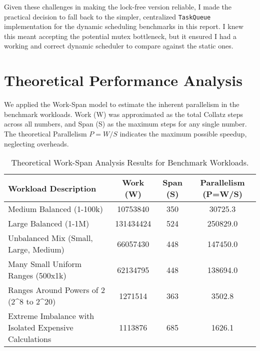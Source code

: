 \documentclass[10pt]{article}
\newcommand{\code}[1]{\texttt{#1}} %
\begin{document}
Given these challenges in making the lock-free version reliable, I made the practical decision to fall back to the simpler, centralized \code{TaskQueue} implementation for the dynamic scheduling benchmarks in this report. I knew this meant accepting the potential mutex bottleneck, but it ensured I had a working and correct dynamic scheduler to compare against the static ones.


\section{Theoretical Performance Analysis}

We applied the Work-Span model to estimate the inherent parallelism in the benchmark workloads. Work (W) was approximated as the total Collatz steps across all numbers, and Span (S) as the maximum steps for any single number. The theoretical Parallelism $P = W/S$ indicates the maximum possible speedup, neglecting overheads.

\begin{table}[H] %
    \centering
    \caption{Theoretical Work-Span Analysis Results for Benchmark Workloads.}
    \label{tab:theoretical}
    \begin{tabular}{@{}l S[table-format=9.0] S[table-format=3.0] S[table-format=6.1]@{}} %
        \toprule
        Workload Description                                                      & {Work (W)} & {Span (S)} & {Parallelism (P=W/S)} \\ \midrule
        Medium Balanced (1-100k)                                                  & 10753840   & 350        & 30725.3               \\
        Large Balanced (1-1M)                                                     & 131434424  & 524        & 250829.0              \\
        Unbalanced Mix (Small, Large, Medium)                                     & 66057430   & 448        & 147450.0              \\
        Many Small Uniform Ranges (500x1k)                                        & 62134795   & 448        & 138694.0              \\
        Ranges Around Powers of 2 (2\textasciicircum{}8 to 2\textasciicircum{}20) & 1271514    & 363        & 3502.8                \\
        Extreme Imbalance with Isolated Expensive Calculations                    & 1113876    & 685        & 1626.1                \\ \bottomrule
    \end{tabular}
\end{table}
\end{document}
